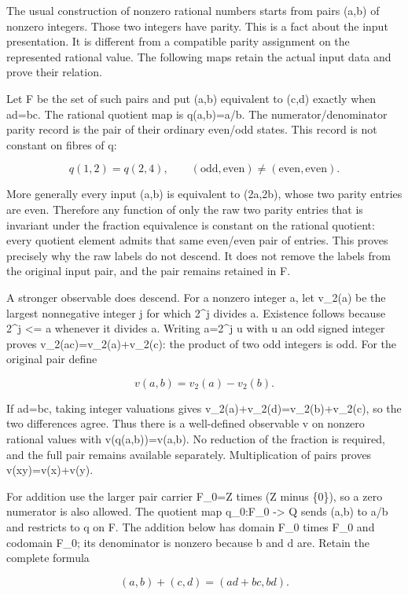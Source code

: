 \documentclass[
]{article}
\begin{document}
The usual construction of nonzero rational numbers starts from pairs
(a,b) of nonzero integers. Those two integers have parity. This is a
fact about the input presentation. It is different from a compatible
parity assignment on the represented rational value. The following maps
retain the actual input data and prove their relation.

Let F be the set of such pairs and put (a,b) equivalent to (c,d) exactly
when ad=bc. The rational quotient map is q(a,b)=a/b. The
numerator/denominator parity record is the pair of their ordinary
even/odd states. This record is not constant on fibres of q:

\[
q(1,2)=q(2,4),\qquad
(\mathrm{odd},\mathrm{even})\ne(\mathrm{even},\mathrm{even}).
\tag{R6.1}
\]

More generally every input (a,b) is equivalent to (2a,2b), whose two
parity entries are even. Therefore any function of only the raw two
parity entries that is invariant under the fraction equivalence is
constant on the rational quotient: every quotient element admits that
same even/even pair of entries. This proves precisely why the raw labels
do not descend. It does not remove the labels from the original input
pair, and the pair remains retained in F.

A stronger observable does descend. For a nonzero integer a, let v\_2(a)
be the largest nonnegative integer j for which 2\^{}j divides a.
Existence follows because 2\^{}j \textless= \textbar a\textbar{}
whenever it divides a. Writing a=2\^{}j u with u an odd signed integer
proves v\_2(ac)=v\_2(a)+v\_2(c): the product of two odd integers is odd.
For the original pair define

\[
v(a,b)=v_2(a)-v_2(b).
\tag{R6.2}
\]

If ad=bc, taking integer valuations gives
v\_2(a)+v\_2(d)=v\_2(b)+v\_2(c), so the two differences agree. Thus
there is a well-defined observable v on nonzero rational values with
v(q(a,b))=v(a,b). No reduction of the fraction is required, and the full
pair remains available separately. Multiplication of pairs proves
v(xy)=v(x)+v(y).

For addition use the larger pair carrier F\_0=Z times (Z minus \{0\}),
so a zero numerator is also allowed. The quotient map q\_0:F\_0
-\textgreater{} Q sends (a,b) to a/b and restricts to q on F. The
addition below has domain F\_0 times F\_0 and codomain F\_0; its
denominator is nonzero because b and d are. Retain the complete formula

\[
(a,b)+(c,d)=(ad+bc,bd).
\tag{R6.3}
\]
\end{document}
